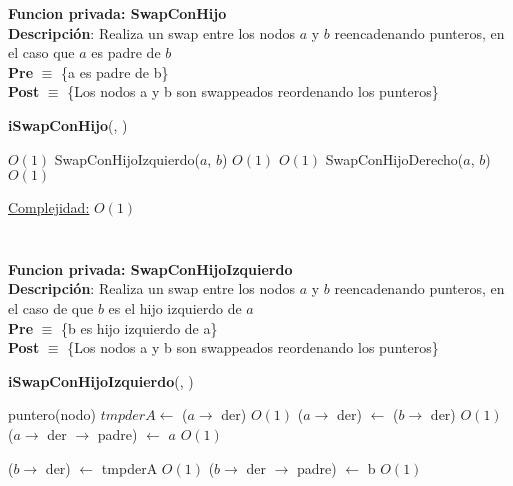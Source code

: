 \begin{Algoritmos}
$ $\newline

\textbf{Funcion privada: SwapConHijo}\\
\textbf{Descripci\'on}: Realiza un swap entre los nodos $a$ y $b$ reencadenando punteros, en el caso que $a$ es padre de $b$\\ 
\textbf{Pre} $\equiv$ \{a es padre de b\}\\%
\textbf{Post} $\equiv$ \{Los nodos a y b son swappeados reordenando los punteros\}%
\begin{algorithm}[H]
{\textbf{iSwapConHijo}(, )}
\begin{algorithmic}[1]

     \Comment $O(1)$
        \State SwapConHijoIzquierdo($a$, $b$) \Comment $O(1)$
    \Else {} \Comment $O(1)$
            \State SwapConHijoDerecho($a$, $b$) \Comment $O(1)$
        \EndIf 
    \EndIf 

    \medskip
    \Statex \underline{Complejidad:} $O(1)$

\end{algorithmic}
\end{algorithm}

$ $\newline



$ $\newline

\textbf{Funcion privada: SwapConHijoIzquierdo}\\
\textbf{Descripci\'on}: Realiza un swap entre los nodos $a$ y $b$ reencadenando punteros, en el caso de que $b$ es el hijo izquierdo de $a$\\ 
\textbf{Pre} $\equiv$ \{b es hijo izquierdo de a\}\\%
\textbf{Post} $\equiv$ \{Los nodos a y b son swappeados reordenando los punteros\}%
\begin{algorithm}[H]
{\textbf{iSwapConHijoIzquierdo}(, )}
\begin{algorithmic}[1]

    \State puntero(nodo) $tmpderA \gets$ ($a \to$ der) \Comment $O(1)$
    \State ($a \to$ der) $\gets$ ($b \to$ der)  \Comment $O(1)$
        \State ($a \to$ der $\to$ padre) $\gets$ $a$ \Comment $O(1)$
    \EndIf

    \State ($b \to$ der) $\gets$ tmpderA  \Comment $O(1)$
        \State ($b \to$ der $\to$ padre) $\gets$ b  \Comment $O(1)$
    \EndIf
    

\end{algorithmic}
\end{algorithm}
\end{Algoritmos}

